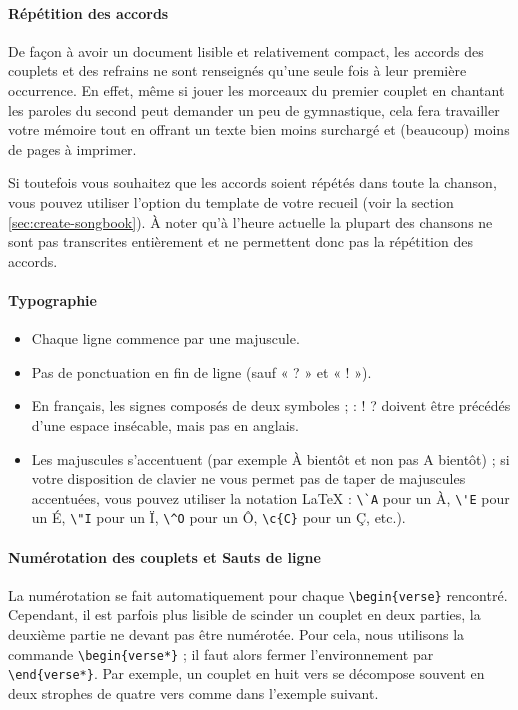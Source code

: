 \paragraph{Répétition des accords}
De façon à avoir un document lisible et relativement compact, les
accords des couplets et des refrains ne sont renseignés qu'une seule
fois à leur première occurrence. En effet, même si jouer les morceaux
du premier couplet en chantant les paroles du second peut demander un
peu de gymnastique, cela fera travailler votre mémoire tout en offrant
un texte bien moins surchargé et (beaucoup) moins de pages à imprimer.

Si toutefois vous souhaitez que les accords soient répétés dans toute la
chanson, vous pouvez utiliser l'option  du
template de votre recueil (voir la section \ref{sec:create-songbook}).
À noter qu'à l'heure actuelle la plupart des chansons ne sont pas
transcrites entièrement et ne permettent donc pas la répétition des
accords.

\paragraph{Typographie}
\begin{itemize}
  \item Chaque ligne commence par une majuscule.
  \item Pas de ponctuation en fin de ligne (sauf « ? » et « ! »).
  \item En français, les signes composés de deux symboles
    {\og}; : ! ?{\fg} doivent être précédés d'une espace insécable, mais
    pas en anglais.
  \item Les majuscules s'accentuent (par exemple {\og}À bientôt{\fg}
    et non pas {\og}A bientôt{\fg}) ; si votre disposition de clavier ne
    vous permet pas de taper de majuscules accentuées, vous pouvez
    utiliser la notation \LaTeX{} : \verb|\`A| pour un \`A, \verb|\'E|
    pour un \'E, \verb|\"I| pour un \"I, \verb|\^O| pour un \^O,
    \verb|\c{C}| pour un \c{C}, etc.).
\end{itemize}

\paragraph{Numérotation des couplets et Sauts de ligne}
La numérotation se fait automatiquement pour chaque
\verb|\begin{verse}| rencontré. Cependant, il est parfois plus
lisible de scinder un couplet en deux parties, la deuxième partie ne
devant pas être numérotée. Pour cela, nous utilisons la commande
\verb|\begin{verse*}| ; il faut alors fermer l'environnement par
\verb|\end{verse*}|. Par exemple, un couplet en huit vers se
décompose souvent en deux strophes de quatre vers comme dans l'exemple
suivant.

